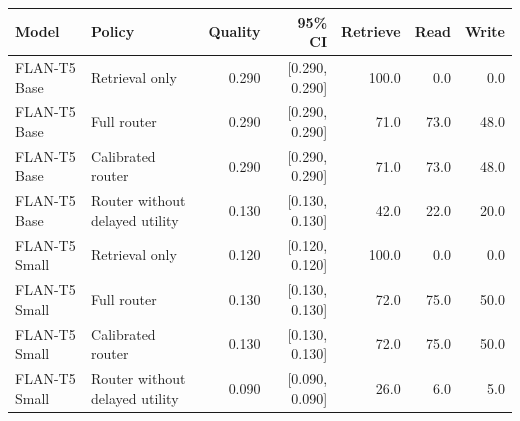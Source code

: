\begin{tabular}{llrrrrr}
\toprule
Model & Policy & Quality & 95\% CI & Retrieve & Read & Write \\
\midrule
FLAN-T5 Base & Retrieval only & 0.290 & [0.290, 0.290] & 100.0 & 0.0 & 0.0 \\
FLAN-T5 Base & Full router & 0.290 & [0.290, 0.290] & 71.0 & 73.0 & 48.0 \\
FLAN-T5 Base & Calibrated router & 0.290 & [0.290, 0.290] & 71.0 & 73.0 & 48.0 \\
FLAN-T5 Base & Router without delayed utility & 0.130 & [0.130, 0.130] & 42.0 & 22.0 & 20.0 \\
FLAN-T5 Small & Retrieval only & 0.120 & [0.120, 0.120] & 100.0 & 0.0 & 0.0 \\
FLAN-T5 Small & Full router & 0.130 & [0.130, 0.130] & 72.0 & 75.0 & 50.0 \\
FLAN-T5 Small & Calibrated router & 0.130 & [0.130, 0.130] & 72.0 & 75.0 & 50.0 \\
FLAN-T5 Small & Router without delayed utility & 0.090 & [0.090, 0.090] & 26.0 & 6.0 & 5.0 \\
\bottomrule
\end{tabular}

